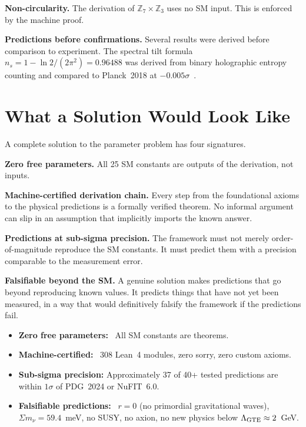 \documentclass[11pt,a4paper]{article}
\begin{document}
\textbf{Non-circularity.}
The derivation of $\mathbb{Z}_7 \times \mathbb{Z}_3$ uses no SM input.
This is enforced by the machine proof.

\textbf{Predictions before confirmations.}
Several results were derived before comparison to experiment.
The spectral tilt formula $n_s = 1 - \ln 2 / (2\pi^2) = 0.96488$ was
derived from binary holographic entropy counting and compared to
Planck~2018 at $-0.005\sigma$~\cite{SpivackGTECosmology}.

\section{What a Solution Would Look Like}
\label{sec:solution}

A complete solution to the parameter problem has four signatures.

\textbf{Zero free parameters.}
All 25 SM constants are outputs of the derivation, not inputs.

\textbf{Machine-certified derivation chain.}
Every step from the foundational axioms to the physical predictions is a
formally verified theorem.
No informal argument can slip in an assumption that implicitly imports
the known answer.

\textbf{Predictions at sub-sigma precision.}
The framework must not merely order-of-magnitude reproduce the SM constants.
It must predict them with a precision comparable to the measurement error.

\textbf{Falsifiable beyond the SM.}
A genuine solution makes predictions that go beyond reproducing known values.
It predicts things that have not yet been measured, in a way that would
definitively falsify the framework if the predictions fail.

\begin{tcolorbox}[colback=boxgreen,colframe=green!50!black,
  title={The GTE scorecard (from P48~\cite{SpivackGTECompleteFramework})},breakable]
\begin{itemize}[itemsep=2pt]
  \item \textbf{Zero free parameters:} \checkmark\ All SM constants are theorems.
  \item \textbf{Machine-certified:} \checkmark\ 308 Lean~4 modules, zero sorry,
        zero custom axioms.
  \item \textbf{Sub-sigma precision:}
        Approximately 37 of 40+ tested predictions are within $1\sigma$
        of PDG~2024 or NuFIT~6.0.
  \item \textbf{Falsifiable predictions:} \checkmark\ $r = 0$ (no primordial
        gravitational waves), $\Sigma m_\nu = 59.4$~meV, no SUSY, no axion,
        no new physics below $\Lambda_{\rm GTE} \approx 2$~GeV.
\end{itemize}
\end{tcolorbox}
\end{document}

